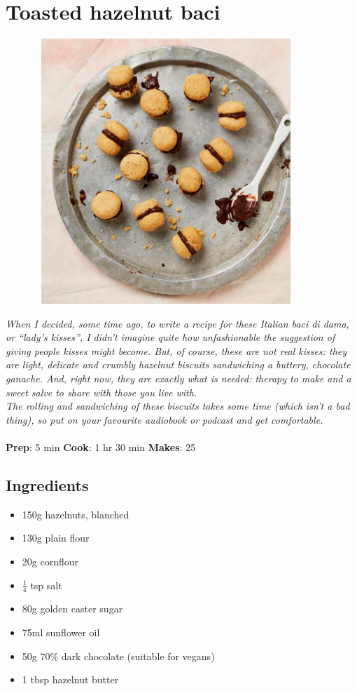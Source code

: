 \documentclass{book}
\begin{document}
\section{Toasted hazelnut baci}
\begin{figure}
\centering\includegraphics[width=10cm,height=10cm,keepaspectratio]{Recipe_Pictures/Toasted_hazelnut_baci.png}
\end{figure}
\emph{When I decided, some time ago, to write a recipe for these Italian baci di dama, or “lady’s kisses”, I didn’t imagine quite how unfashionable the suggestion of giving people kisses might become. But, of course, these are not real kisses: they are light, delicate and crumbly hazelnut biscuits sandwiching a buttery, chocolate ganache. And, right now, they are exactly what is needed: therapy to make and a sweet salve to share with those you live with.\\ 
The rolling and sandwiching of these biscuits takes some time (which isn’t a bad thing), so put on your favourite audiobook or podcast and get comfortable.}\\\\ 
\textbf{Prep}: 5 min
\textbf{Cook}: 1 hr 30 min
\textbf{Makes}: 25
\subsection*{Ingredients}
\begin{itemize}
\item 150g hazelnuts, blanched 
\item 130g plain flour 
\item 20g cornflour
\item $\frac{1}{4}$ tsp salt
\item 80g golden caster sugar 
\item 75ml sunflower oil 
\item 50g 70\% dark chocolate (suitable for vegans)
\item 1 tbsp hazelnut butter
\end{itemize}
\end{document}
